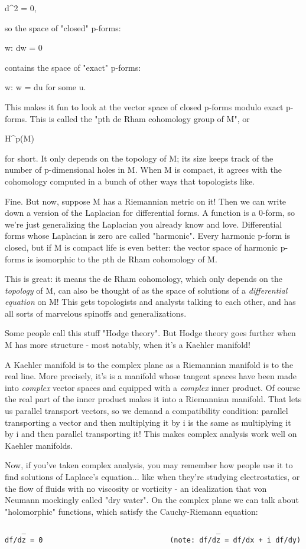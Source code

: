 d^{2} = 0,

so the space of "closed" p-forms:

{w: dw = 0}

contains the space of "exact" p-forms:

{w: w = du for some u}.

This makes it fun to look at the vector space of closed p-forms modulo
exact p-forms.  This is called the "pth de Rham cohomology group of
M", or

H^{p}(M)

for short.  It only depends on the topology of M; its size keeps track
of the number of p-dimensional holes in M.  When M is compact, it 
agrees with the cohomology computed in a bunch of other ways that 
topologists like.

Fine.  But now, suppose M has a Riemannian metric on it!  Then we can
write down a version of the Laplacian for differential forms.  A
function is a 0-form, so we're just generalizing the Laplacian you
already know and love.  Differential forms whose Laplacian is zero are
called "harmonic".  Every harmonic p-form is closed, but if M is compact
life is even better: the vector space of harmonic p-forms is isomorphic
to the pth de Rham cohomology of M.

This is great: it means the de Rham cohomology, which only depends on
the \emph{topology} of M, can also be thought of as the space of solutions
of a \emph{differential equation} on M!  This gets topologists and analysts
talking to each other, and has all sorts of marvelous spinoffs and
generalizations.

Some people call this stuff "Hodge theory".  But Hodge theory
goes further when M has more structure - most notably, when it's
a Kaehler manifold!  

A Kaehler manifold is to the complex plane as a Riemannian manifold is
to the real line.  More precisely, it's is a manifold whose tangent
spaces have been made into \emph{complex} vector spaces and equipped with a
\emph{complex} inner product.  Of course the real part of the inner product
makes it into a Riemannian manifold.  That lets us parallel transport
vectors, so we demand a compatibility condition: parallel transporting 
a vector and then multiplying it by i is the same as multiplying it by i
and then parallel transporting it!  This makes complex analysis work
well on Kaehler manifolds.

Now, if you've taken complex analysis, you may remember how people use
it to find solutions of Laplace's equation... like when they're studying
electrostatics, or the flow of fluids with no viscosity or vorticity -
an idealization that von Neumann mockingly called "dry water".  On 
the complex plane we can talk about "holomorphic" functions, which 
satisfy the Cauchy-Riemann equation:
\begin{verbatim}
    _                                             _ 
df/dz = 0                              (note: df/dz = df/dx + i df/dy)
\end{verbatim}
    

